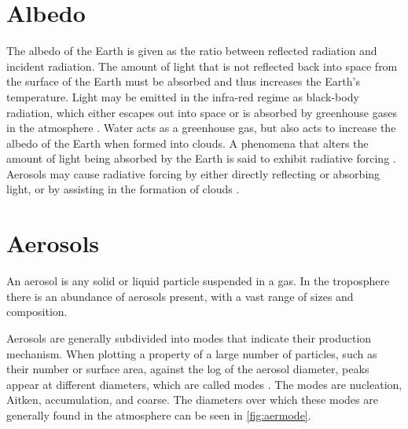 
\section{Albedo}
\label{sec:albedo}

The albedo of the Earth is given as the ratio between reflected radiation and incident radiation. The amount of light that is not reflected back into space from the surface of the Earth must be absorbed and thus increases the Earth's temperature. Light may be emitted in the infra-red regime as black-body radiation, which either escapes out into space or is absorbed by greenhouse gases in the atmosphere \citep{Lashof:1990wu}. Water acts as a greenhouse gas, but also acts to increase the albedo of the Earth when formed into clouds. A phenomena that alters the amount of light being absorbed by the Earth is said to exhibit radiative forcing \citep{intergovernmentalpanelonclimatechange:2015fa}. Aerosols may cause radiative forcing by either directly reflecting or absorbing light, or by assisting in the formation of clouds \citep{seinfeld2012atmospheric}.



	\section{Aerosols}
	\label{sec:aerosols}

	An aerosol is any solid or liquid particle suspended in a gas. In the troposphere there is an abundance of aerosols present, with a vast range of sizes and composition.

	Aerosols are generally subdivided into modes that indicate their production mechanism. When plotting a property of a large number of particles, such as their number or surface area, against the log of the aerosol diameter, peaks appear at different diameters, which are called modes \citep[Chapter 8]{seinfeld2012atmospheric}. The modes are nucleation, Aitken, accumulation, and coarse. The diameters over which these modes are generally found in the atmosphere can be seen in \cref{fig:aermode}.

